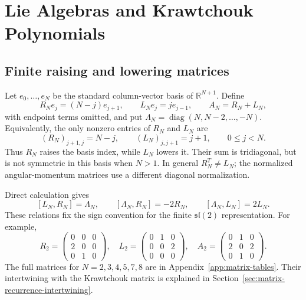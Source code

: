 \chapter{Lie Algebras and Krawtchouk Polynomials}
\label{ch:6}

\section{Finite raising and lowering matrices}
\label{sec:finite-sl2-matrices}
Let $e_0,\ldots,e_N$ be the standard column-vector basis of
$\mathbb R^{N+1}$. Define
\begin{equation}\label{eq:ency-RL-definition}
R_Ne_j=(N-j)e_{j+1},\qquad L_Ne_j=je_{j-1},\qquad
A_N=R_N+L_N,
\end{equation}
with endpoint terms omitted, and put
$\Lambda_N=\operatorname{diag}(N,N-2,\ldots,-N)$.
Equivalently, the only nonzero entries of $R_N$ and $L_N$ are
\[
(R_N)_{j+1,j}=N-j,\qquad (L_N)_{j,j+1}=j+1,
\qquad 0\le j<N.
\]
Thus $R_N$ raises the basis index, while $L_N$ lowers it.
Their sum is tridiagonal, but is not symmetric in this basis when
$N>1$. In general $R_N^T\ne L_N$; the normalized angular-momentum
matrices use a different diagonal normalization.

Direct calculation gives
\begin{equation}\label{eq:ency-sl2-brackets}
[L_N,R_N]=\Lambda_N,\qquad
[\Lambda_N,R_N]=-2R_N,\qquad
[\Lambda_N,L_N]=2L_N.
\end{equation}
These relations fix the sign convention for the finite
$\mathfrak{sl}(2)$ representation. For example,
\[
R_2=\begin{pmatrix}0&0&0\\2&0&0\\0&1&0\end{pmatrix},\quad
L_2=\begin{pmatrix}0&1&0\\0&0&2\\0&0&0\end{pmatrix},\quad
A_2=\begin{pmatrix}0&1&0\\2&0&2\\0&1&0\end{pmatrix}.
\]
The full matrices for $N=2,3,4,5,7,8$ are in
Appendix~\ref{app:matrix-tables}. Their intertwining with the
Krawtchouk matrix is explained in
Section~\ref{sec:matrix-recurrence-intertwining}.


